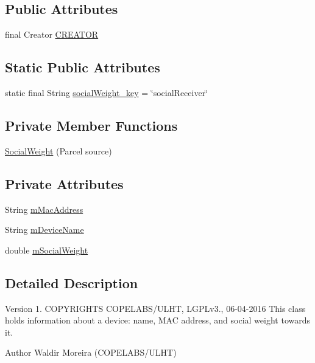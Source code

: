 \subsection*{Public Attributes}
\begin{DoxyCompactItemize}
\item 
final Creator \hyperlink{classcom_1_1copelabs_1_1oiframework_1_1socialproximity_1_1_social_weight_a6bcb16eb1fe0d7db7cc1ca394b863efd}{C\+R\+E\+A\+T\+O\+R}
\end{DoxyCompactItemize}
\subsection*{Static Public Attributes}
\begin{DoxyCompactItemize}
\item 
static final String \hyperlink{classcom_1_1copelabs_1_1oiframework_1_1socialproximity_1_1_social_weight_a7f08f601ecd8ad6f108323f0d5a5d2b1}{social\+Weight\+\_\+key} = \char`\"{}social\+Receiver\char`\"{}
\end{DoxyCompactItemize}
\subsection*{Private Member Functions}
\begin{DoxyCompactItemize}
\item 
\hyperlink{classcom_1_1copelabs_1_1oiframework_1_1socialproximity_1_1_social_weight_a8171e0fc44f59be1a58ed7ef9be58362}{Social\+Weight} (Parcel source)
\end{DoxyCompactItemize}
\subsection*{Private Attributes}
\begin{DoxyCompactItemize}
\item 
String \hyperlink{classcom_1_1copelabs_1_1oiframework_1_1socialproximity_1_1_social_weight_a93b91c868be4a9d3e395d46242ab96c4}{m\+Mac\+Address}
\item 
String \hyperlink{classcom_1_1copelabs_1_1oiframework_1_1socialproximity_1_1_social_weight_a6fa473ff39400696fd831ca519170610}{m\+Device\+Name}
\item 
double \hyperlink{classcom_1_1copelabs_1_1oiframework_1_1socialproximity_1_1_social_weight_a4c005dbeda3565c7049babdb95a391c7}{m\+Social\+Weight}
\end{DoxyCompactItemize}


\subsection{Detailed Description}
\begin{DoxyVersion}{Version}
1. C\+O\+P\+Y\+R\+I\+G\+H\+T\+S C\+O\+P\+E\+L\+A\+B\+S/\+U\+L\+H\+T, L\+G\+P\+Lv3., 06-\/04-\/2016 This class holds information about a device\+: name, M\+A\+C address, and social weight towards it. 
\end{DoxyVersion}
\begin{DoxyAuthor}{Author}
Waldir Moreira (C\+O\+P\+E\+L\+A\+B\+S/\+U\+L\+H\+T) 
\end{DoxyAuthor}


